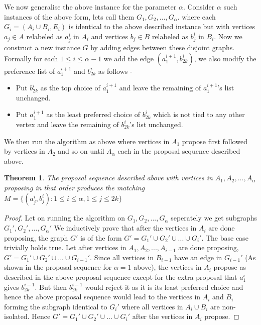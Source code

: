 \documentclass[a4paper,10pt]{article}
\theoremstyle{plain} %
\newtheorem{theorem}{Theorem}[section] %
\theoremstyle{plain} %
\begin{document}
We now generalise the above instance for the parameter $\alpha$. Consider $\alpha$ such instances of the above form, lets call them $G_1, G_2, ..., G_{\alpha}$. where each $G_i = (A_i \cup B_i, E_i)$ is identical to the above described instance but with vertices $a_j \in A$ relabeled as $a^i_j$ in $A_i$ and vertices $b_j \in B$ relabeled as $b^i_j$ in $B_i$. Now we construct a new instance $G$ by adding edges between these disjoint graphs. Formally for each $1 \leq i \leq \alpha - 1$ we add the edge $(a^{i+1}_{1}, b^{i}_{2k})$, we also modify the preference list of $a^{i+1}_{1}$ and $b^i_{2k}$ as follows - 
\begin{itemize}
    \item Put $b^i_{2k}$ as the top choice of $a^{i+1}_1$ and leave the remaining of $a^{i+1}_1$'s list unchanged.
    \item Put $a^{i+1}_{1}$ as the least preferred choice of $b^{i}_{2k}$ which is not tied to any other vertex and leave the remaining of $b^{i}_{2k}$'s list unchanged.
\end{itemize}

We then run the algorithm as above where vertices in $A_1$ propose first followed by vertices in $A_{2}$ and so on until $A_\alpha$ each in the proposal sequence described above.

\begin{theorem}
    The proposal sequence described above with vertices in $A_1, A_2, ..., A_\alpha$ proposing in that order produces the matching $M = \{(a^i_j, b^i_j): 1 \leq i \leq \alpha, 1 \leq j \leq 2k\}$
\end{theorem}

\begin{proof}
    Let on running the algorithm on $G_1, G_2, ..., G_\alpha$ seperately we get subgraphs $G_1', G_2', ..., G_\alpha'$ We inductively prove that after the vertices in $A_i$ are done proposing, the graph $G'$ is of the form $G' = G_1' \cup G_2' \cup ... \cup G_{i}'$. The base case trivially holds true. Let after vertices in $A_1, A_2, ..., A_{i-1}$ are done proposing, $G' = G_1' \cup G_2' \cup ... \cup G_{i-1}'$. Since all vertices in $B_{i-1}$ have an edge in $G_{i-1}'$ (As shown in the proposal sequence for $\alpha = 1$ above), the vertices in $A_i$ propose as described in the above proposal sequence except for the extra proposal that $a^i_1$ gives $b^{i-1}_{2k}$. But then $b^{i-1}_{2k}$ would reject it as it is its least preferred choice and hence the above proposal sequence would lead to the vertices in $A_i$ and $B_i$ forming the subgraph identical to $G_i'$ where all vertices in $A_i \cup B_i$ are non-isolated. Hence $G' = G_1' \cup G_2' \cup ... \cup G_{i}'$ after the vertices in $A_i$ propose.
\end{proof}
\end{document}
